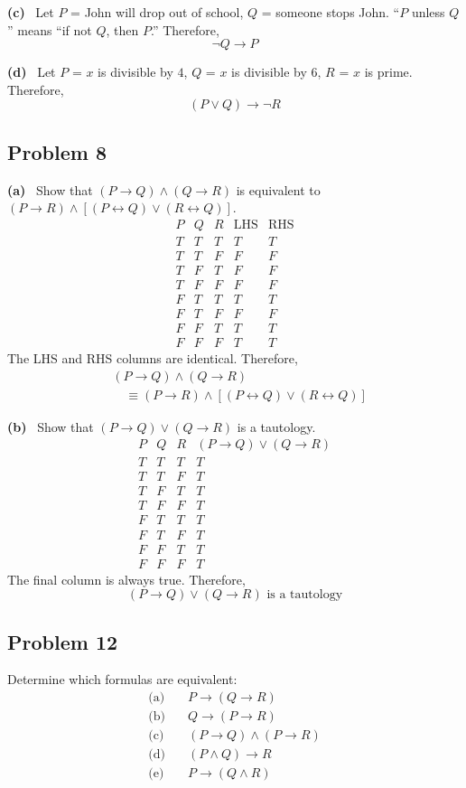 \documentclass[11pt,a4paper]{article}
\newcommand{\sub}[1]{\par\medskip\textbf{(#1)}\ }
\begin{document}
\sub{c} Let $P$ = John will drop out of school, $Q$ = someone stops John. ``$P$ unless $Q$'' means ``if not $Q$, then $P$.'' Therefore,
\[
\boxed{\neg Q\to P}
\]

\sub{d} Let $P$ = $x$ is divisible by $4$, $Q$ = $x$ is divisible by $6$, $R$ = $x$ is prime. Therefore,
\[
\boxed{(P\lor Q)\to\neg R}
\]

\subsection*{Problem 8}

\sub{a} Show that $(P\to Q)\land(Q\to R)$ is equivalent to $(P\to R)\land[(P\leftrightarrow Q)\lor(R\leftrightarrow Q)]$.
\[
\begin{array}{ccc|c|c}
P&Q&R&\text{LHS}&\text{RHS}\\
\hline
T&T&T&T&T\\
T&T&F&F&F\\
T&F&T&F&F\\
T&F&F&F&F\\
F&T&T&T&T\\
F&T&F&F&F\\
F&F&T&T&T\\
F&F&F&T&T
\end{array}
\]
The LHS and RHS columns are identical. Therefore,
\[
\boxed{\begin{aligned}
&(P\to Q)\land(Q\to R)\\
&\quad\equiv (P\to R)\land[(P\leftrightarrow Q)\lor(R\leftrightarrow Q)]
\end{aligned}}
\]

\sub{b} Show that $(P\to Q)\lor(Q\to R)$ is a tautology.
\[
\begin{array}{ccc|c}
P&Q&R&(P\to Q)\lor(Q\to R)\\
\hline
T&T&T&T\\
T&T&F&T\\
T&F&T&T\\
T&F&F&T\\
F&T&T&T\\
F&T&F&T\\
F&F&T&T\\
F&F&F&T
\end{array}
\]
The final column is always true. Therefore,
\[
\boxed{(P\to Q)\lor(Q\to R)\text{ is a tautology}}
\]

\subsection*{Problem 12}
Determine which formulas are equivalent:
\begin{align*}
\text{(a)}&\quad P\to(Q\to R)\\
\text{(b)}&\quad Q\to(P\to R)\\
\text{(c)}&\quad(P\to Q)\land(P\to R)\\
\text{(d)}&\quad(P\land Q)\to R\\
\text{(e)}&\quad P\to(Q\land R)
\end{align*}
\end{document}
